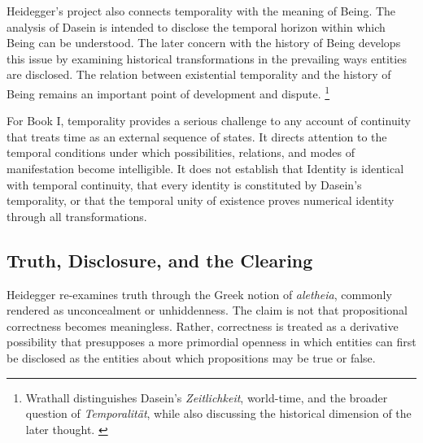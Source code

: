 \label{para:VS.B01.P01.C08.S11.SS10.P003}

Heidegger's project also connects temporality
with the meaning of Being. The analysis of
Dasein is intended to disclose the temporal
horizon within which Being can be understood.
The later concern with the history of Being
develops this issue by examining historical
transformations in the prevailing ways entities
are disclosed. The relation between existential
temporality and the history of Being remains
an important point of development and dispute.
\footnote{Wrathall distinguishes Dasein's
\textit{Zeitlichkeit}, world-time, and the broader
question of \textit{Temporalität}, while also
discussing the historical dimension of the later
thought. \cite{WrathallHeideggerSEP2025}}

\label{para:VS.B01.P01.C08.S11.SS10.P004}

For Book I, temporality provides a serious challenge
to any account of continuity that treats time as
an external sequence of states. It directs attention
to the temporal conditions under which possibilities,
relations, and modes of manifestation become
intelligible. It does not establish that Identity
is identical with temporal continuity, that every
identity is constituted by Dasein's temporality,
or that the temporal unity of existence proves
numerical identity through all transformations.



\subsection{Truth, Disclosure, and the Clearing}
\label{subsec:ch08-heidegger-clearing}

\label{para:VS.B01.P01.C08.S11.SS11.P001}

Heidegger re-examines truth through the Greek
notion of \textit{aletheia}, commonly rendered
as unconcealment or unhiddenness. The claim is
not that propositional correctness becomes
meaningless. Rather, correctness is treated as
a derivative possibility that presupposes a
more primordial openness in which entities
can first be disclosed as the entities about
which propositions may be true or false.
\cite[§44]{HeideggerBeingTime}

